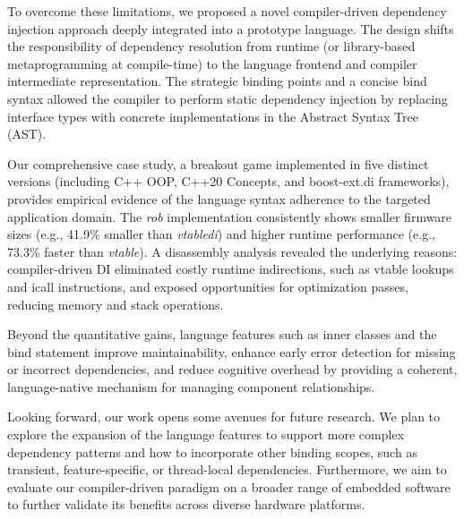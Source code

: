 \documentclass[sigconf]{acmart}
\begin{document}
To overcome these limitations, we proposed a novel compiler-driven dependency injection approach deeply integrated into a prototype language. The design shifts the responsibility of dependency resolution from runtime (or library-based metaprogramming at compile-time) to the language frontend and compiler intermediate representation. The strategic binding points and a concise bind syntax allowed the compiler to perform static dependency injection by replacing interface types with concrete implementations in the Abstract Syntax Tree (AST).

Our comprehensive case study, a breakout game implemented in five distinct versions (including C++ OOP, C++20 Concepts, and boost-ext.di frameworks), provides empirical evidence of the language syntax adherence to the targeted application domain. The \emph{rob} implementation consistently shows smaller firmware sizes (e.g., 41.9\% smaller than \emph{vtabledi}) and higher runtime performance (e.g., 73.3\% faster than \emph{vtable}). A disassembly analysis revealed the underlying reasons: compiler-driven DI eliminated costly runtime indirections, such as vtable lookups and icall instructions, and exposed opportunities for optimization passes, reducing memory and stack operations. 

Beyond the quantitative gains, language features such as inner classes and the bind statement improve maintainability, enhance early error detection for missing or incorrect dependencies, and reduce cognitive overhead by providing a coherent, language-native mechanism for managing component relationships.

Looking forward, our work opens some avenues for future research. We plan to explore the expansion of the language features to support more complex dependency patterns and how to incorporate other binding scopes, such as transient, feature-specific, or thread-local dependencies. Furthermore, we aim to evaluate our compiler-driven paradigm on a broader range of embedded software to further validate its benefits across diverse hardware platforms.



\end{document}

